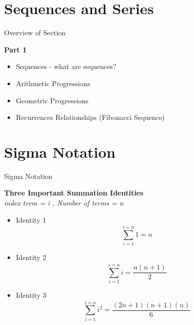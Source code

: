 

\section{Sequences and Series}


{Overview of Section}

\textbf{Part 1}
  \begin{itemize}
  \item Sequences - what are sequences?

  \item Arithmetic Progressions

  \item Geometric Progressions
   
  \item Recurrences Relationships (Fibonacci Sequence)
 
   \end{itemize}




\section{Sigma Notation}

{Sigma Notation}

\textbf{Three Important Summation Identities}\\
\textit{index term = i , Number of terms = n }

\begin{itemize}
\item Identity 1
\[ \sum^{i=n}_{i=1} 1 = n \]
\item Identity 2  
\[ \sum^{i=n}_{i=1} i = \frac{n(n+1)}{2} \]
\item Identity 3 
\[ \sum^{i=n}_{i=1} i^2 = \frac{(2n+1)(n+1)(n)}{6} \]
\end{itemize}








